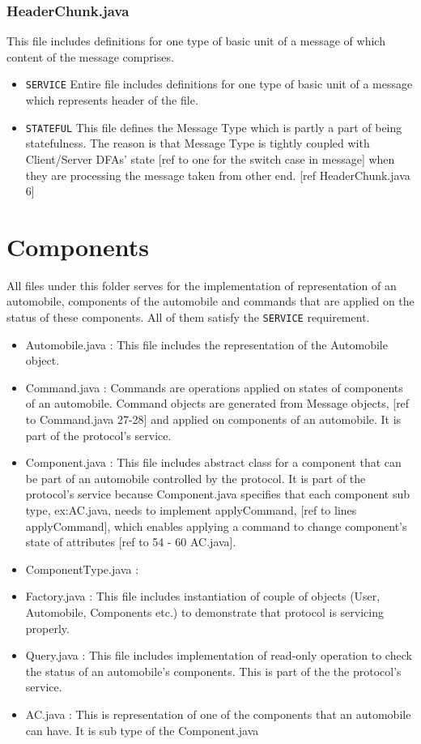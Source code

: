 \documentclass[12pt]{usenixsubmit}
\begin{document}
    \subsubsection{HeaderChunk.java}This file includes definitions for one type of basic unit of a message of which content of the message comprises.
    \begin{itemize}
    \item {\tt SERVICE} Entire file includes definitions for one type of basic unit of a message which represents header of the file.
      \item {\tt STATEFUL} This file defines the Message Type  which is partly a part of being statefulness. The reason is that Message Type is tightly coupled with Client/Server DFAs' state [ref to one for the switch case in message] when they are processing the message taken from other end. [ref HeaderChunk.java 6]
     \end{itemize}   

  \section{Components} All files under this folder serves for the implementation of representation of an automobile, components of the automobile and commands that are applied on the status of these components. All of them satisfy the {\tt SERVICE} requirement.
  \begin{itemize}
  \item Automobile.java : This file includes the representation of the Automobile object.
  \item Command.java : Commands are operations applied on states of components of an automobile. Command objects are generated from Message objects, [ref to Command.java 27-28] and applied on components of an automobile. It is part of the protocol's service.
  \item Component.java :  This file includes abstract class for a component that can be part of an automobile controlled by the protocol. It is part of the protocol's service because Component.java specifies that each component sub type, ex:AC.java, needs to implement \textsf{applyCommand}, [ref to lines applyCommand], which enables applying a command to change component's state of attributes [ref to 54 - 60 AC.java]. 
  \item ComponentType.java : 
  \item Factory.java : This file includes instantiation of couple of objects (User, Automobile, Components etc.) to demonstrate that protocol is servicing properly.
  \item Query.java : This file includes implementation of read-only operation to check the status of an automobile's components. This is part of the the protocol's service.
  \item AC.java : This is representation of one of the components that an automobile can have. It is sub type of the Component.java
  \end{itemize}
  
\end{document}
